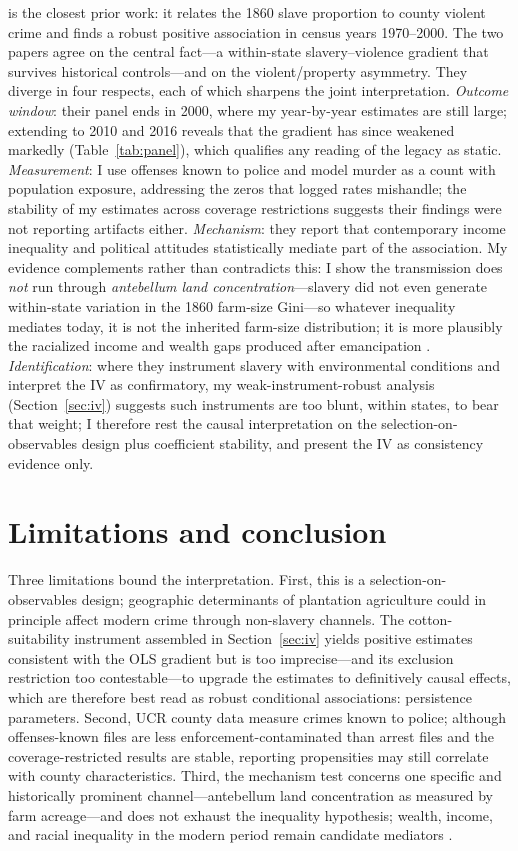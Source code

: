 \documentclass[12pt]{article}
\begin{document}
\citet{gouda2025} is the closest prior work: it relates the 1860 slave proportion to county violent crime and finds a robust positive association in census years 1970--2000. The two papers agree on the central fact---a within-state slavery--violence gradient that survives historical controls---and on the violent/property asymmetry. They diverge in four respects, each of which sharpens the joint interpretation. \emph{Outcome window}: their panel ends in 2000, where my year-by-year estimates are still large; extending to 2010 and 2016 reveals that the gradient has since weakened markedly (Table~\ref{tab:panel}), which qualifies any reading of the legacy as static. \emph{Measurement}: I use offenses known to police and model murder as a count with population exposure, addressing the zeros that logged rates mishandle; the stability of my estimates across coverage restrictions suggests their findings were not reporting artifacts either. \emph{Mechanism}: they report that contemporary income inequality and political attitudes statistically mediate part of the association. My evidence complements rather than contradicts this: I show the transmission does \emph{not} run through \emph{antebellum land concentration}---slavery did not even generate within-state variation in the 1860 farm-size Gini---so whatever inequality mediates today, it is not the inherited farm-size distribution; it is more plausibly the racialized income and wealth gaps produced after emancipation \citep{sacerdote2005, bertocchi2014}. \emph{Identification}: where they instrument slavery with environmental conditions and interpret the IV as confirmatory, my weak-instrument-robust analysis (Section~\ref{sec:iv}) suggests such instruments are too blunt, within states, to bear that weight; I therefore rest the causal interpretation on the selection-on-observables design plus coefficient stability, and present the IV as consistency evidence only.

\section{Limitations and conclusion}\label{sec:conclusion}

Three limitations bound the interpretation. First, this is a selection-on-observables design; geographic determinants of plantation agriculture could in principle affect modern crime through non-slavery channels. The cotton-suitability instrument assembled in Section~\ref{sec:iv} yields positive estimates consistent with the OLS gradient but is too imprecise---and its exclusion restriction too contestable---to upgrade the estimates to definitively causal effects, which are therefore best read as robust conditional associations: persistence parameters. Second, UCR county data measure crimes known to police; although offenses-known files are less enforcement-contaminated than arrest files and the coverage-restricted results are stable, reporting propensities may still correlate with county characteristics. Third, the mechanism test concerns one specific and historically prominent channel---antebellum land concentration as measured by farm acreage---and does not exhaust the inequality hypothesis; wealth, income, and racial inequality in the modern period remain candidate mediators \citep{gouda2025}.
\end{document}
